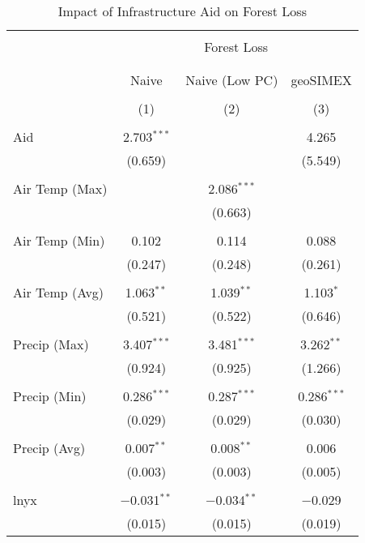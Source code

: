 
\begin{table}[!htbp] \centering 
  \caption{Impact of Infrastructure Aid on Forest Loss} 
  \label{} 
\begin{tabular}{@{\extracolsep{5pt}}lccc} 
\\[-1.8ex]\hline 
\hline \\[-1.8ex] 
 & \multicolumn{3}{c}{Forest Loss} \\ 
\cline{2-4} 
\\[-1.8ex] & \multicolumn{3}{c}{} \\ 
 & Naive & Naive (Low PC) & geoSIMEX \\ 
\\[-1.8ex] & (1) & (2) & (3)\\ 
\hline \\[-1.8ex] 
 Aid & 2.703$^{***}$ &  & 4.265 \\ 
  & (0.659) &  & (5.549) \\ 
  & & & \\ 
 Air Temp (Max) &  & 2.086$^{***}$ &  \\ 
  &  & (0.663) &  \\ 
  & & & \\ 
 Air Temp (Min) & 0.102 & 0.114 & 0.088 \\ 
  & (0.247) & (0.248) & (0.261) \\ 
  & & & \\ 
 Air Temp (Avg) & 1.063$^{**}$ & 1.039$^{**}$ & 1.103$^{*}$ \\ 
  & (0.521) & (0.522) & (0.646) \\ 
  & & & \\ 
 Precip (Max) & 3.407$^{***}$ & 3.481$^{***}$ & 3.262$^{**}$ \\ 
  & (0.924) & (0.925) & (1.266) \\ 
  & & & \\ 
 Precip  (Min) & 0.286$^{***}$ & 0.287$^{***}$ & 0.286$^{***}$ \\ 
  & (0.029) & (0.029) & (0.030) \\ 
  & & & \\ 
 Precip  (Avg) & 0.007$^{**}$ & 0.008$^{**}$ & 0.006 \\ 
  & (0.003) & (0.003) & (0.005) \\ 
  & & & \\ 
 lnyx & $-$0.031$^{**}$ & $-$0.034$^{**}$ & $-$0.029 \\ 
  & (0.015) & (0.015) & (0.019) \\ 

\end{tabular}
\end{table}
